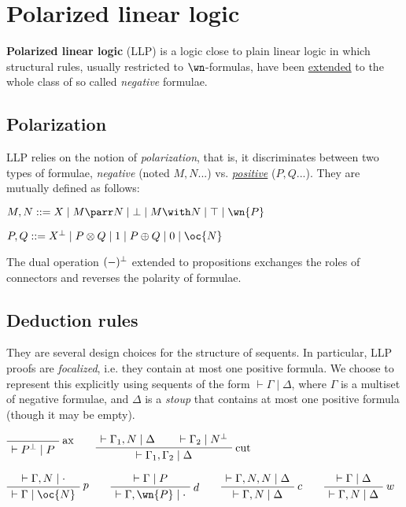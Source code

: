 \section{Polarized linear logic}\label{polarized-linear-logic}

\textbf{Polarized linear logic} (LLP) is a logic close to plain linear
logic in which structural rules, usually restricted to \(\wn\)-formulas,
have been
\href{Positive_formula\#Generalized_structural_rules}{extended} to the
whole class of so called \emph{negative} formulae.

\subsection{Polarization}\label{polarization}

LLP relies on the notion of \emph{polarization}, that is, it
discriminates between two types of formulae, \emph{negative} (noted
\(M, N...\)) vs. \emph{\href{Positive_formula}{positive}} (\(P, Q...\)).
They are mutually defined as follows:

\(M, N ::= X \mid M \parr N \mid \bot \mid M \with N \mid \top \mid \wn{P}\)

\(P, Q ::= X\orth \mid P \otimes Q \mid 1 \mid P \oplus Q \mid 0 \mid \oc{N}\)

The dual operation \((-)^\bot\) extended to propositions exchanges the
roles of connectors and reverses the polarity of formulae.

\subsection{Deduction rules}\label{deduction-rules}

They are several design choices for the structure of sequents. In
particular, LLP proofs are \emph{focalized}, i.e. they contain at most
one positive formula. We choose to represent this explicitly using
sequents of the form \(\vdash\Gamma\mid\Delta\), where \(\Gamma\) is a
multiset of negative formulae, and \(\Delta\) is a \emph{stoup} that
contains at most one positive formula (though it may be empty).

\(\LabelRule{\rulename{ax}}
\NulRule{\vdash P\orth \mid P}
\DisplayProof
\qquad
\AxRule{\vdash \Gamma_1, N \mid \Delta}
\AxRule{\vdash \Gamma_2 \mid N\orth}
\LabelRule{\rulename{cut}}
\BinRule{\vdash\Gamma_1, \Gamma_2 \mid \Delta}
\DisplayProof\)

\(\AxRule{\vdash\Gamma, N\mid\cdot}
\LabelRule{p}
\UnaRule{\vdash\Gamma\mid \oc{N}}
\DisplayProof
\qquad
\AxRule{\vdash\Gamma\mid P}
\LabelRule{d}
\UnaRule{\vdash\Gamma,\wn{P}\mid \cdot}
\DisplayProof
\qquad
\AxRule{\vdash\Gamma,N,N\mid \Delta}
\LabelRule{c}
\UnaRule{\vdash\Gamma, N\mid\Delta}
\DisplayProof
\qquad
\AxRule{\vdash\Gamma\mid \Delta}
\LabelRule{w}
\UnaRule{\vdash\Gamma,N\mid\Delta}
\DisplayProof\)

